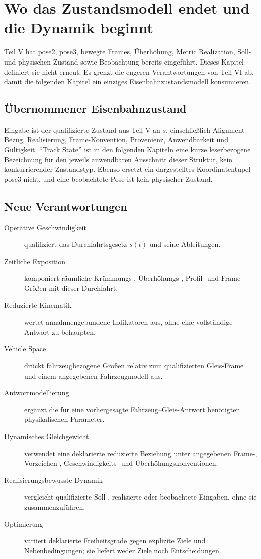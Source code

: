 \chapter{Wo das Zustandsmodell endet und die Dynamik beginnt}
\label{chap:concept-boundaries}

Teil V hat pose2, pose3, bewegte Frames, Überhöhung, Metric Realization, Soll-
und physischen Zustand sowie Beobachtung bereits eingeführt. Dieses Kapitel
definiert sie nicht erneut. Es grenzt die engeren Verantwortungen von Teil VI
ab, damit die folgenden Kapitel ein einziges Eisenbahnzustandsmodell
konsumieren.

\section{Übernommener Eisenbahnzustand}

Eingabe ist der qualifizierte Zustand aus Teil V an \(s\), einschließlich
Alignment-Bezug, Realisierung, Frame-Konvention, Provenienz, Anwendbarkeit und
Gültigkeit. ``Track State'' ist in den folgenden Kapiteln eine kurze
leserbezogene Bezeichnung für den jeweils anwendbaren Ausschnitt dieser
Struktur, kein konkurrierender Zustandstyp. Ebenso ersetzt ein dargestelltes
Koordinatentupel pose3 nicht, und eine beobachtete Pose ist kein physischer
Zustand.

\section{Neue Verantwortungen}

\begin{description}
\item[Operative Geschwindigkeit] qualifiziert das Durchfahrtsgesetz \(s(t)\)
und seine Ableitungen.
\item[Zeitliche Exposition] komponiert räumliche Krümmungs-, Überhöhungs-,
Profil- und Frame-Größen mit dieser Durchfahrt.
\item[Reduzierte Kinematik] wertet annahmengebundene Indikatoren aus, ohne eine
vollständige Antwort zu behaupten.
\item[Vehicle Space] drückt fahrzeugbezogene Größen relativ zum qualifizierten
Gleis-Frame und einem angegebenen Fahrzeugmodell aus.
\item[Antwortmodellierung] ergänzt die für eine vorhergesagte
Fahrzeug--Gleis-Antwort benötigten physikalischen Parameter.
\item[Dynamisches Gleichgewicht] verwendet eine deklarierte reduzierte
Beziehung unter angegebenen Frame-, Vorzeichen-, Geschwindigkeits- und
Überhöhungskonventionen.
\item[Realisierungsbewusste Dynamik] vergleicht qualifizierte Soll-, realisierte
oder beobachtete Eingaben, ohne sie zusammenzuführen.
\item[Optimierung] variiert deklarierte Freiheitsgrade gegen explizite Ziele
und Nebenbedingungen; sie liefert weder Ziele noch Entscheidungen.
\end{description}

